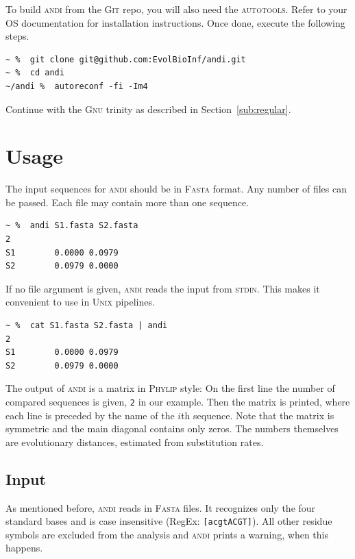 \documentclass[a4paper,
  10pt,
  english,
  DIV=12,
  BCOR=8mm]{scrbook}
\newcommand{\algo}[1]{\textsc{{#1}}}
\newcommand{\andi}{\algo{andi}\xspace}
\begin{document}
To build \andi from the \algo{Git} repo, you will also need the \algo{autotools}. Refer to your OS documentation for installation instructions. Once done, execute the following steps.

\begin{lstlisting}
~ %  git clone git@github.com:EvolBioInf/andi.git
~ %  cd andi
~/andi %  autoreconf -fi -Im4
\end{lstlisting}

\noindent Continue with the \algo{Gnu} trinity as described in Section~\ref{sub:regular}.


\chapter{Usage} %

The input sequences for \andi should be in \algo{Fasta} format. Any number of files can be passed. Each file may contain more than one sequence.

\begin{lstlisting}
~ %  andi S1.fasta S2.fasta
2
S1        0.0000 0.0979
S2        0.0979 0.0000
\end{lstlisting}

If no file argument is given, \andi reads the input from \algo{stdin}. This makes it convenient to use in \algo{Unix} pipelines.

\begin{lstlisting}
~ %  cat S1.fasta S2.fasta | andi
2
S1        0.0000 0.0979
S2        0.0979 0.0000
\end{lstlisting}

The output of \andi is a matrix in \algo{Phylip} style: On the first line the number of compared sequences is given, \lstinline!2! in our example. Then the matrix is printed, where each line is preceded by the name of the $i$th sequence. Note that the matrix is symmetric and the main diagonal contains only zeros. The numbers themselves are evolutionary distances, estimated from substitution rates.


\section{Input} \label{sec:join}

As mentioned before, \andi reads in \algo{Fasta} files. It recognizes only the four standard bases and is case insensitive (RegEx: \lstinline![acgtACGT]!). All other residue symbols are excluded from the analysis and \andi prints a warning, when this happens.
\end{document}
